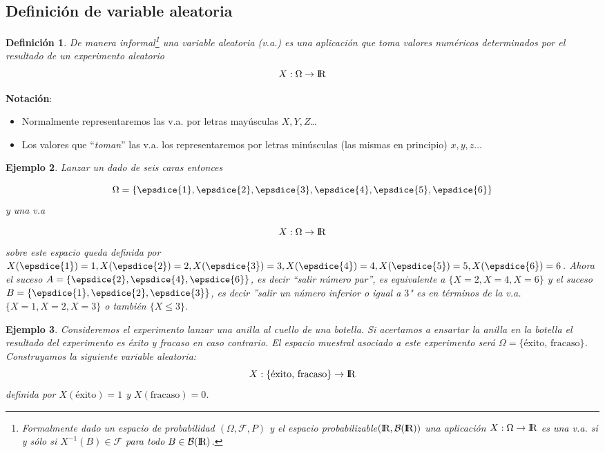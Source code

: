 \documentclass[12pt]{report}
\newtheorem{definition}{Definici\'on}
\newtheorem{example}[definition]{Ejemplo}
\begin{document}
  \subsection{Definición de variable aleatoria}
  \begin{definition}
   De manera informal\footnote{Formalmente dado un espacio de probabilidad $(\Omega,\mathcal{F},P)$ y
    el espacio probabilizable\newline $(\mbox{I\kern-.2em\hbox{R}},\mathcal{B}(\mbox{I\kern-.2em\hbox{R}}))$ una aplicación $X:\Omega\to\mbox{I\kern-.2em\hbox{R}}$ es una v.a. si y
    sólo si $X^{-1}(B)\in \mathcal{F}$ para todo $B\in\mathcal{B}(\mbox{I\kern-.2em\hbox{R}})$.} una variable
    aleatoria (v.a.) es una aplicación que toma valores numéricos determinados por el resultado de un experimento aleatorio
   $$X:\Omega\to\mbox{I\kern-.2em\hbox{R}}$$
   \end{definition}

   \textbf{Notación}:
   \begin{itemize}
       \item Normalmente representaremos las v.a. por letras
       mayúsculas $X,Y,Z$\ldots
       \item Los valores que ``\emph{toman}'' las v.a. los
       representaremos por letras minúsculas (las mismas en principio)
       $x,y,z\ldots$
    \end{itemize}

\begin{example}
Lanzar un dado de seis caras entonces

$$\Omega=\{\epsdice{1}, \epsdice{2}, \epsdice{3}, \epsdice{4},  \epsdice{5},
\epsdice{6}\}$$
y  una v.a

$$X:\Omega\to\mbox{I\kern-.2em\hbox{R}}$$
 sobre este espacio queda definida por $X( \epsdice{1})=1,X( \epsdice{2})=2,X( \epsdice{3})=3,
 X( \epsdice{4})=4,X( \epsdice{5})=5,X( \epsdice{6})=6$. Ahora el suceso $A=\{ \epsdice{2},
  \epsdice{4}, \epsdice{6}\}$, es decir ``salir
número par'', es equivalente a $\{X=2,X=4,X=6\}$ y el suceso $B=\{ \epsdice{1},
  \epsdice{2}, \epsdice{3}\}$, es decir ''salir un número
inferior o igual a $3$" es  en términos de la v.a. $\{X=1,X=2,X=3\}$ o también $\{X\leq
3\}$.
\end{example}

\begin{example}
Consideremos el experimento lanzar una anilla al cuello de una botella. Si acertamos a
ensartar la anilla en la botella el resultado del experimento es \emph{éxito} y
\emph{fracaso} en caso contrario. El espacio muestral asociado a este experimento será
$\Omega=\{\mbox{éxito, fracaso}\}$. Construyamos la siguiente variable aleatoria:
$$X:\{\mbox{éxito, fracaso}\}\to\mbox{I\kern-.2em\hbox{R}}$$
definida por $X(\mbox{éxito})=1$ y  $X(\mbox{fracaso})=0$.
\end{example}
\end{document}
